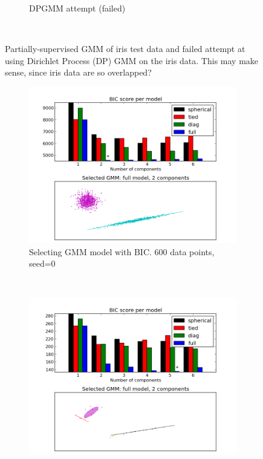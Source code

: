 \documentclass{article}
\begin{document}
\begin{figure}
\begin{subfigure}[h]{0.5\textwidth}
                    \caption{DPGMM attempt (failed)}
                    \label{fig:GMMfail}
            \end{subfigure}
            ~ %
            \caption{Partially-supervised GMM of iris test data and failed attempt at using Dirichlet Process (DP) GMM on the iris data.  This may make sense, since iris data are so overlapped?}\label{fig:GMM}
    \end{figure}

    \begin{figure}
            \centering
            \begin{subfigure}[h]{0.5\textwidth}
                    \centering
                    \includegraphics[width=\textwidth]{gmm_select_orig.png}
                    \caption{Selecting GMM model with BIC. 600 data points, seed=0}
                    \label{fig:GMMSelectOrig}
            \end{subfigure}%
            ~ %
            \begin{subfigure}[h]{0.5\textwidth}
                    \centering
                    \includegraphics[width=\textwidth]{gmm_select_aic_noseed_n15.png}

\end{subfigure}
\end{figure}
\end{document}
